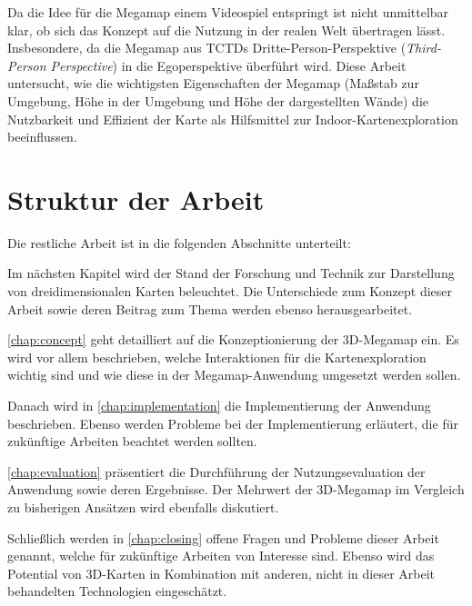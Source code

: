 

Da die Idee für die Megamap einem Videospiel entspringt ist nicht unmittelbar klar, ob sich das Konzept auf die Nutzung in der realen Welt übertragen lässt.
Insbesondere, da die Megamap aus TCTDs Dritte-Person-Perspektive (\emph{Third-Person Perspective}) in die Egoperspektive überführt wird.
Diese Arbeit untersucht, wie die wichtigsten Eigenschaften der Megamap (Maßstab zur Umgebung, Höhe in der Umgebung und Höhe der dargestellten Wände) die Nutzbarkeit und Effizient der Karte als Hilfsmittel zur Indoor-Kartenexploration beeinflussen.

\section{Struktur der Arbeit}
\label{sec:struktur}
Die restliche Arbeit ist in die folgenden Abschnitte unterteilt:

Im nächsten Kapitel wird der Stand der Forschung und Technik zur Darstellung von dreidimensionalen Karten beleuchtet.
Die Unterschiede zum Konzept dieser Arbeit sowie deren Beitrag zum Thema werden ebenso herausgearbeitet.

\autoref{chap:concept} geht detailliert auf die Konzeptionierung der 3D-Megamap ein.
Es wird vor allem beschrieben, welche Interaktionen für die Kartenexploration wichtig sind und wie diese in der Megamap-Anwendung umgesetzt werden sollen.

Danach wird in \autoref{chap:implementation} die Implementierung der Anwendung beschrieben.
Ebenso werden Probleme bei der Implementierung erläutert, die für zukünftige Arbeiten beachtet werden sollten.

\autoref{chap:evaluation} präsentiert die Durchführung der Nutzungsevaluation der Anwendung sowie deren Ergebnisse.
Der Mehrwert der 3D-Megamap im Vergleich zu bisherigen Ansätzen wird ebenfalls diskutiert.

Schließlich werden in \autoref{chap:closing} offene Fragen und Probleme dieser Arbeit genannt, welche für zukünftige Arbeiten von Interesse sind.
Ebenso wird das Potential von 3D-Karten in Kombination mit anderen, nicht in dieser Arbeit behandelten Technologien eingeschätzt.
%
\cleardoublepage
